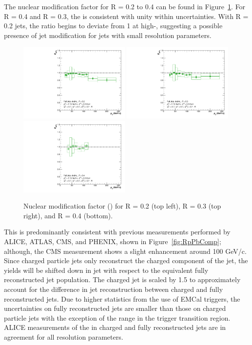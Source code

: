 The nuclear modification factor for R = 0.2 to 0.4 can be found in Figure~\ref{fig:finalRpPb}. For R = 0.4 and R = 0.3, the \RpPb is consistent with unity within uncertainties. With R = 0.2 jets, the ratio begins to deviate from 1 at high-\pT, suggesting a possible presence of jet modification for jets with small resolution parameters.

\begin{figure}[hbt!]
    \centering
    \includegraphics[width=0.49\textwidth]{figures/pPbFigures/RpPb/ptscheme/RpPb_R02.pdf}
    \includegraphics[width=0.49\textwidth]{figures/pPbFigures/RpPb/ptscheme/RpPb_R03.pdf}
    \includegraphics[width=0.49\textwidth]{figures/pPbFigures/RpPb/ptscheme/RpPb_R04.pdf}
    \caption{Nuclear modification factor (\RpPb) for R = 0.2 (top left), R = 0.3 (top right), and R = 0.4 (bottom).}
    \label{fig:finalRpPb}
\end{figure}

This is predominantly consistent with previous measurements performed by ALICE, ATLAS, CMS, and PHENIX, shown in Figure~\ref{fig:RpPbComp}; although, the CMS measurement shows a slight enhancement around 100 GeV/c. Since charged particle jets only reconstruct the charged component of the jet, the yields will be shifted down in jet \pT with respect to the equivalent fully reconstructed jet population. The charged jet \RpPb is scaled by 1.5 to approximately account for the difference in jet reconstruction between charged and fully reconstructed jets. Due to higher statistics from the use of EMCal triggers, the uncertainties on fully reconstructed jets are smaller than those on charged particle jets with the exception of the \pT range in the trigger transition region. ALICE measurements of the \RpPb in charged and fully reconstructed jets are in agreement for all resolution parameters.

